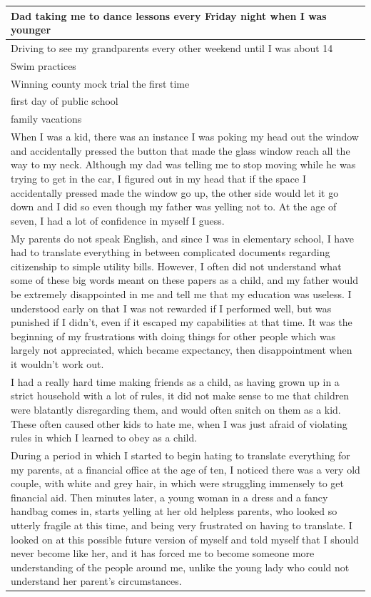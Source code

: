 \documentclass[
  .7em,
  letterpaper,
  DIV=11,
  numbers=noendperiod]{scrartcl}
\begin{document}
\begin{table}
\begin{tabular}{l}
\hline
Dad taking me to dance lessons every Friday night when I was younger\\
\hline
Driving to see my grandparents every other weekend until I was about 14\\
\hline
Swim practices\\
\hline
Winning county mock trial the first time\\
\hline
first day of public school\\
\hline
family vacations\\
\hline
When I was a kid, there was an instance I was poking my head out the window and accidentally pressed the button that made the glass window reach all the way to my neck. Although my dad was telling me to stop moving while he was trying to get in the car, I figured out in my head that if the space I accidentally pressed made the window go up, the other side would let it go down and I did so even though my father was yelling not to. At the age of seven, I had a lot of confidence in myself I guess.\\
\hline
My parents do not speak English, and since I was in elementary school, I have had to translate everything in between complicated documents regarding citizenship to simple utility bills. However, I often did not understand what some of these big words meant on these papers as a child, and my father would be extremely disappointed in me and tell me that my education was useless. I understood early on that I was not rewarded if I performed well, but was punished if I didn't, even if it escaped my capabilities at that time. It was the beginning of my frustrations with doing things for other people which was largely not appreciated, which became expectancy, then disappointment when it wouldn't work out.\\
\hline
I had a really hard time making friends as a child, as having grown up in a strict household with a lot of rules, it did not make sense to me that children were blatantly disregarding them, and would often snitch on them as a kid. These often caused other kids to hate me, when I was just afraid of violating rules in which I learned to obey as a child.\\
\hline
During a period in which I started to begin hating to translate everything for my parents, at a financial office at the age of ten, I noticed there was a very old couple, with white and grey hair, in which were struggling immensely to get financial aid. Then minutes later, a young woman in a dress and a fancy handbag comes in, starts yelling at her old helpless parents, who looked so utterly fragile at this time, and being very frustrated on having to translate. I looked on at this possible future version of myself and told myself that I should never become like her, and it has forced me to become someone more understanding of the people around me, unlike the young lady who could not understand her parent's circumstances.\\

\end{tabular}
\end{table}
\end{document}
